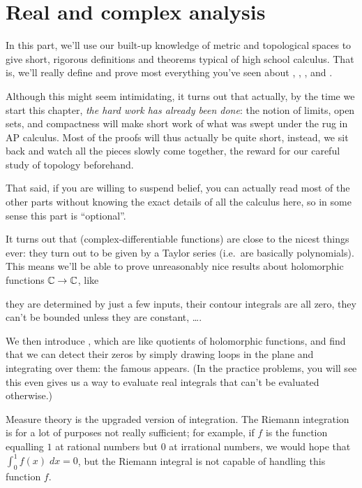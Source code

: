 \section{Real and complex analysis}
\begin{itemize}
In this part, we'll use our built-up knowledge of
metric and topological spaces to give short, rigorous definitions
and theorems typical of high school calculus.
That is, we'll really define and prove most everything you've seen about
, , , and .

Although this might seem intimidating,
it turns out that actually, by the time we start this chapter,
\emph{the hard work has already been done}:
the notion of limits, open sets, and compactness
will make short work of what was swept under the rug in AP calculus.
Most of the proofs will thus actually be quite short,
instead, we sit back and watch all the pieces slowly come together,
the reward for our careful study of topology beforehand.

That said, if you are willing to suspend belief,
you can actually read most of the other parts
without knowing the exact details of all the calculus here,
so in some sense this part is ``optional''.

It turns out that 
(complex-differentiable functions)
are close to the nicest things ever:
they turn out to be given by a Taylor series
(i.e.\ are basically polynomials).
This means we'll be able to prove unreasonably nice results
about holomorphic functions $\mathbb C \to \mathbb C$, like
\begin{itemize}
	\ii they are determined by just a few inputs,
	\ii their contour integrals are all zero,
	\ii they can't be bounded unless they are constant,
	\ii \dots.
\end{itemize}
We then introduce ,
which are like quotients of holomorphic functions,
and find that we can detect their zeros by simply drawing
loops in the plane and integrating over them:
the famous  appears.
(In the practice problems, you will see this even gives
us a way to evaluate real integrals that can't be evaluated otherwise.)

Measure theory is the upgraded version of integration.
The Riemann integration is for a lot of purposes not really sufficient;
for example, if $f$ is the function equalling $1$ at rational numbers
but $0$ at irrational numbers,
we would hope that $\int_0^1 f(x) \; dx = 0$,
but the Riemann integral is not capable of handling this function $f$.


\end{itemize}
